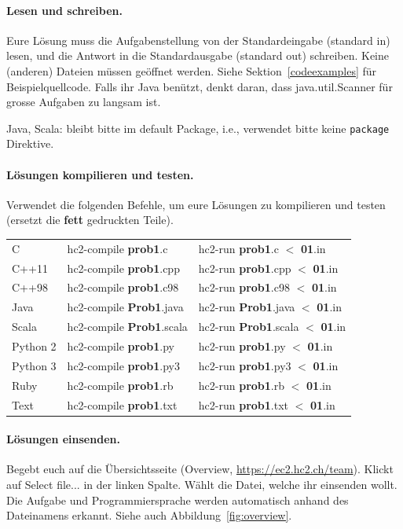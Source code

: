 \paragraph{Lesen und schreiben.}
Eure Lösung muss die Aufgabenstellung von der Standardeingabe (\glqq standard in\grqq{})
lesen, und die Antwort in die Standardausgabe (\glqq standard out\grqq{}) schreiben.
Keine (anderen) Dateien müssen geöffnet werden.
Siehe Sektion~\ref{codeexamples} für Beispielquellcode.
Falls ihr Java benützt, denkt daran, dass java.util.Scanner für grosse
Aufgaben zu langsam ist.

Java, Scala: bleibt bitte im default Package, i.e., verwendet bitte keine \texttt{package} Direktive.

\paragraph{Lösungen kompilieren und testen.}
Verwendet die folgenden Befehle, um eure Lösungen zu kompilieren und testen (ersetzt die
\textbf{fett} gedruckten Teile).
\begin{center}
\begin{tabular}{l|p{5cm}|p{7cm}}
C&hc2-compile \textbf{prob1}.c &hc2-run \textbf{prob1}.c $<$ \textbf{01}.in\\
C++11&hc2-compile \textbf{prob1}.cpp &hc2-run \textbf{prob1}.cpp $<$ \textbf{01}.in\\
C++98&hc2-compile \textbf{prob1}.c98 &hc2-run \textbf{prob1}.c98 $<$ \textbf{01}.in\\
Java&hc2-compile \textbf{Prob1}.java &hc2-run \textbf{Prob1}.java $<$ \textbf{01}.in\\
Scala&hc2-compile \textbf{Prob1}.scala &hc2-run \textbf{Prob1}.scala $<$ \textbf{01}.in\\
Python 2&hc2-compile \textbf{prob1}.py &hc2-run \textbf{prob1}.py $<$ \textbf{01}.in\\
Python 3&hc2-compile \textbf{prob1}.py3 &hc2-run \textbf{prob1}.py3 $<$ \textbf{01}.in\\
Ruby&hc2-compile \textbf{prob1}.rb &hc2-run \textbf{prob1}.rb $<$ \textbf{01}.in\\
Text&hc2-compile \textbf{prob1}.txt &hc2-run \textbf{prob1}.txt $<$ \textbf{01}.in\\
\end{tabular}
\end{center}

\paragraph{Lösungen einsenden.}
Begebt euch auf die Übersichtsseite (\glqq Overview\grqq{},
\url{https://ec2.hc2.ch/team}).
Klickt auf \glqq Select file...\grqq{} in der linken Spalte. Wählt die Datei,
welche ihr einsenden wollt. Die Aufgabe und Programmiersprache werden
automatisch anhand des Dateinamens erkannt. Siehe auch
Abbildung~\ref{fig:overview}.

